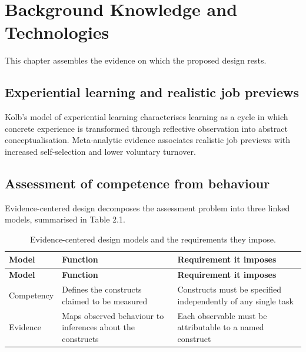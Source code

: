 \newpage
\section{Background Knowledge and Technologies}

This chapter assembles the evidence on which the proposed design rests.

\subsection{Experiential learning and realistic job previews}

Kolb's model of experiential learning\cite{r3} characterises learning as a cycle in which concrete experience is transformed through reflective observation into abstract conceptualisation. Meta-analytic evidence associates realistic job previews with increased self-selection and lower voluntary turnover\cite{r4}.

\subsection{Assessment of competence from behaviour}

Evidence-centered design\cite{r5} decomposes the assessment problem into three linked models, summarised in Table 2.1.

{\small
\begin{longtable}{|>{\raggedright\arraybackslash}p{}|>{\raggedright\arraybackslash}p{}|>{\raggedright\arraybackslash}p{}|}
\caption{Evidence-centered design models and the requirements they impose.} \\
\hline
\textbf{Model} & \textbf{Function} & \textbf{Requirement it imposes} \\ \hline
\endfirsthead
\hline
\textbf{Model} & \textbf{Function} & \textbf{Requirement it imposes} \\ \hline
\endhead
Competency & Defines the constructs claimed to be measured & Constructs must be specified independently of any single task \\ \hline
Evidence & Maps observed behaviour to inferences about the constructs & Each observable must be attributable to a named construct \\ \hline
\end{longtable}
}
